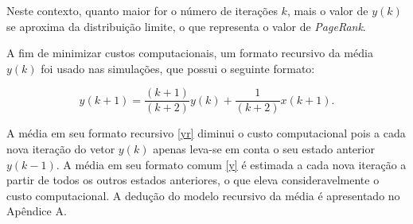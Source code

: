\noindent Neste contexto, quanto maior for o número de iterações $k$, mais o valor de $y(k)$ se aproxima da
distribuição limite, o que representa o valor de \textit{PageRank}.

A fim de minimizar custos computacionais, um formato recursivo da média $y(k)$ foi usado nas simulações, que possui o seguinte formato:

\begin{equation}\label{yr}
	y(k+1) = \frac{(k+1)}{(k+2)}y(k) + \frac{1}{(k+2)}x(k+1).
\end{equation}

A média em seu formato recursivo \eqref{yr} diminui o custo computacional pois a cada nova iteração do vetor $y(k)$ apenas leva-se em conta o seu estado anterior $y(k-1)$. A média em seu formato comum \eqref{y} é estimada a cada nova iteração a partir de todos os outros estados anteriores, o que eleva consideravelmente o custo computacional. A dedução do modelo recursivo da média é apresentado no Apêndice A.